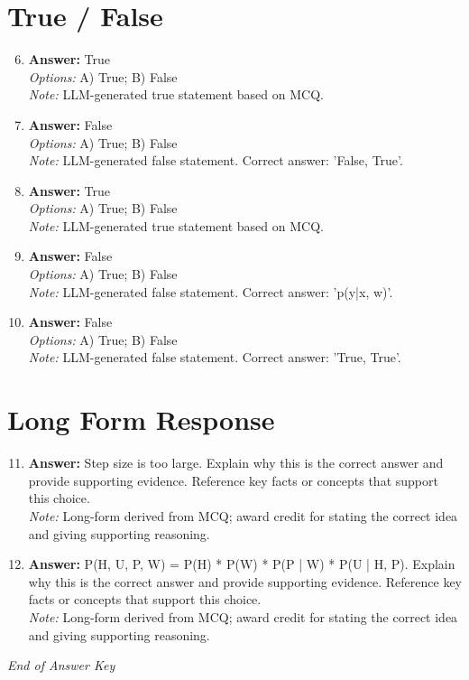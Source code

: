 \documentclass[12pt]{article}
\begin{document}
\section*{True / False}
\begin{enumerate}[label=\arabic*.]
\setcounter{enumi}{5}
\item \textbf{Answer:} True
\\ \textit{Options:} A) True; B) False
\\ \textit{Note:} LLM-generated true statement based on MCQ.
\item \textbf{Answer:} False
\\ \textit{Options:} A) True; B) False
\\ \textit{Note:} LLM-generated false statement. Correct answer: 'False, True'.
\item \textbf{Answer:} True
\\ \textit{Options:} A) True; B) False
\\ \textit{Note:} LLM-generated true statement based on MCQ.
\item \textbf{Answer:} False
\\ \textit{Options:} A) True; B) False
\\ \textit{Note:} LLM-generated false statement. Correct answer: 'p(y|x, w)'.
\item \textbf{Answer:} False
\\ \textit{Options:} A) True; B) False
\\ \textit{Note:} LLM-generated false statement. Correct answer: 'True, True'.
\end{enumerate}

\section*{Long Form Response}
\begin{enumerate}[label=\arabic*.]
\setcounter{enumi}{10}
\item \textbf{Answer:} Step size is too large. Explain why this is the correct answer and provide supporting evidence. Reference key facts or concepts that support this choice.
\\ \textit{Note:} Long-form derived from MCQ; award credit for stating the correct idea and giving supporting reasoning.
\item \textbf{Answer:} P(H, U, P, W) = P(H) * P(W) * P(P | W) * P(U | H, P). Explain why this is the correct answer and provide supporting evidence. Reference key facts or concepts that support this choice.
\\ \textit{Note:} Long-form derived from MCQ; award credit for stating the correct idea and giving supporting reasoning.
\end{enumerate}

\vfill
\noindent\textit{End of Answer Key}
\end{document}

